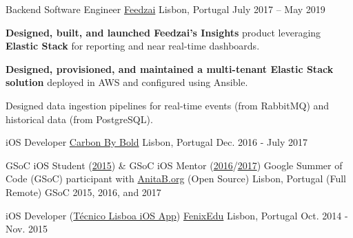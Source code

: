 \begin{cventries}
  \cventry
    {Backend Software Engineer}
    {\href{https://feedzai.com/}{Feedzai}}
    {Lisbon, Portugal}
    {July 2017 – May 2019}
    {
      \begin{cvitems}
        \item \textbf{Designed, built, and launched Feedzai's Insights} product leveraging \textbf{Elastic Stack} for reporting and near real-time dashboards.
        \item \textbf{Designed, provisioned, and maintained a multi-tenant Elastic Stack solution} deployed in AWS and configured using Ansible.
        \item Designed data ingestion pipelines for real-time events (from RabbitMQ) and historical data (from PostgreSQL).
      \end{cvitems}
      \vspace{4mm}
    }


  \cventryShort
    {iOS Developer}
    {\href{https://www.carbonbybold.com/pt-pt/}{Carbon By Bold}}
    {Lisbon, Portugal}
    {Dec. 2016 - July 2017}

  \cventryShort
    {GSoC iOS Student (\href{https://docs.google.com/presentation/d/1yv4XuNNpTgDkyOjL9SSjGe7PSZuwpbah42mQCACxdXQ/}{2015}) \& GSoC iOS Mentor (\href{https://summerofcode.withgoogle.com/archive/2016/projects/5509901874888704/}{2016}/\href{https://summerofcode.withgoogle.com/archive/2017/projects/5508656065937408/}{2017})}
    {Google Summer of Code (GSoC) participant with \href{http://anitaborg.org/}{AnitaB.org} (Open Source)}
    {Lisbon, Portugal (Full Remote)}
    {GSoC 2015, 2016, and 2017}
    
  \cventryShort
    {iOS Developer (\href{https://apps.apple.com/us/app/tecnico-lisboa/id959976468}{Técnico Lisboa iOS App})}
    {\href{http://fenixedu.org/}{FenixEdu}}
    {Lisbon, Portugal}
    {Oct. 2014 - Nov. 2015}

\end{cventries}
